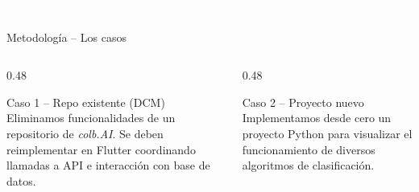 \documentclass[t]{beamer}
\begin{document}
\begin{frame}
\vspace{0.38\textheight}
\begin{center}
    \textcolor{white}{\LARGE Experimentos}
\end{center}
\end{frame}

\begin{frame}{Metodología -- Los casos}
    \begin{columns}[T]
        \begin{column}{0.48\textwidth}
            \begin{block}{Caso 1 -- Repo existente (DCM)}
                \footnotesize
                Eliminamos funcionalidades de un repositorio de \textit{colb.AI}. Se deben reimplementar en Flutter coordinando llamadas a API e interacción con base de datos.
            \end{block}
        \end{column}
        \begin{column}{0.48\textwidth}
            \begin{block}{Caso 2 -- Proyecto nuevo}
                \footnotesize
                Implementamos desde cero un proyecto Python para visualizar el funcionamiento de diversos algoritmos de clasificación.
            \end{block}
        \end{column}
    \end{columns}
\end{frame}
\end{document}
